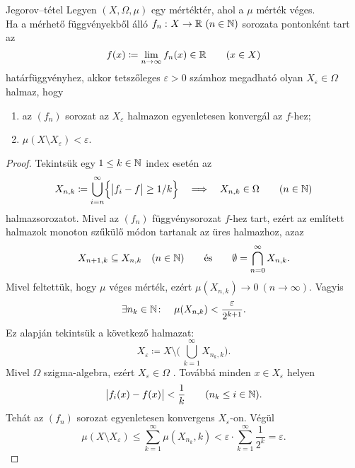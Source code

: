 \documentclass[
]{elteikthesis}[2024/04/26]
\begin{document}
	\begin{theorem}{Jegorov--tétel}{}
		Legyen \( (X, \Omega, \mu) \) egy mértéktér, ahol a \( \mu \) mérték véges.\\
		Ha a mérhető függvényekből álló \( f_n \,\colon X \to \mathbb{R} \ (n \in \mathbb{N}) \) sorozata pontonként tart az
		\[
			f(x) \coloneq \lim_{n \to \infty} f_n(x) \in \mathbb{R} \qquad (x \in X)
		\]
		határfüggvényhez, 
		akkor tetszőleges \( \varepsilon > 0 \) számhoz megadható olyan 
		\( X_\varepsilon \in \Omega \) halmaz, hogy
		\begin{enumerate}
			\item az \( (f_n) \) sorozat az \( X_\varepsilon \) halmazon 
			egyenletesen konvergál az \( f \)-hez;
			\item \( \mu( X \setminus X_\varepsilon ) < \varepsilon \).
		\end{enumerate}
	\end{theorem}
	\begin{proof}
		Tekintsük egy \( 1 \leq k \in \mathbb{N} \) index esetén az
		\[
			X_{n,k} \coloneq \bigcup_{i=n}^{\infty} \Bigl\{ \abs\big{f_i - f} \geq 1 / k \Bigr\}
			\quad \Longrightarrow \quad
			X_{n,k} \in \Omega \qquad (n \in \mathbb{N})
		\]
		halmazsorozatot.
		Mivel az \( (f_n) \) függvénysorozat \( f \)-hez tart, 
		ezért az említett halmazok monoton szűkülő módon tartanak az üres halmazhoz, azaz
		\[
			X_{n+1, k} \subseteq X_{n, k} \quad (n \in \mathbb{N})
			\qquad \text{és} \qquad
			\emptyset = \bigcap_{n=0}^{\infty} X_{n, k}.
		\]
		Mivel feltettük, hogy \( \mu \) véges mérték, 
		ezért \( \mu(X_{n, k}) \longrightarrow 0 \ (n \to \infty) \). Vagyis
		\[
			\exists	n_k \in \mathbb{N} \colon \quad
			\mu(X_{n, k}) < \frac{\varepsilon}{2^{k + 1}}.
		\]
		Ez alapján tekintsük a következő halmazat:
		\[
			X_\varepsilon \coloneq
			X \setminus \Biggl( \, \bigcup_{k=1}^{\infty} X_{n_k, k} \Biggr).
		\]
		Mivel \( \Omega \) szigma-algebra, ezért \( X_\varepsilon \in \Omega \) .
		Továbbá minden \( x \in X_\varepsilon \) helyen
		\[
			\abs\big{ f_i(x) - f(x) } < \frac{1}{k} \qquad (n_k \leq i \in \mathbb{N}).
		\]
		Tehát az \( (f_n) \) sorozat egyenletesen konvergens \( X_\varepsilon \)-on.
		Végül
		\[
			\mu( X \setminus X_\varepsilon ) \leq 
			\sum_{k = 1}^{\infty} \mu(X_{n_k}, k) <
			\varepsilon \cdot \sum_{k = 1}^{\infty} \frac{1}{2^k} =
			\varepsilon.
		\]
	\end{proof}
	
\end{document}
